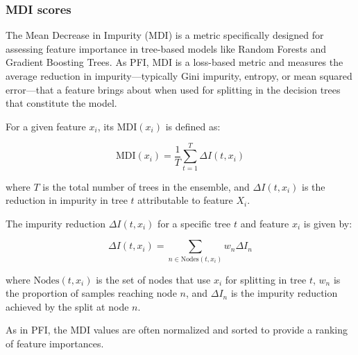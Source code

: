 \subsubsection{MDI scores}

The Mean Decrease in Impurity (\gls{MDI}) is a metric specifically designed for assessing feature importance in tree-based models like Random Forests and Gradient Boosting Trees. As \gls{PFI}, \gls{MDI} is a loss-based metric and measures the average reduction in impurity—typically Gini impurity, entropy, or mean squared error—that a feature brings about when used for splitting in the decision trees that constitute the model.

For a given feature \( x_i \), its \( \text{MDI}(x_i) \) is defined as:

\begin{equation}
\text{MDI}(x_i) = \frac{1}{T} \sum_{t=1}^{T} \Delta I(t, x_i)
\end{equation}

where \( T \) is the total number of trees in the ensemble, and \( \Delta I(t, x_i) \) is the reduction in impurity in tree \( t \) attributable to feature \( X_i \).

The impurity reduction \( \Delta I(t, x_i) \) for a specific tree \( t \) and feature \( x_i \) is given by:

\begin{equation}
\Delta I(t, x_i) = \sum_{n \in \text{Nodes}(t, x_i)} w_n \Delta I_n
\end{equation}

where \( \text{Nodes}(t, x_i) \) is the set of nodes that use \( x_i \) for splitting in tree \(t\), \( w_n \) is the proportion of samples reaching node \(n\), and \( \Delta I_n \) is the impurity reduction achieved by the split at node \( n \).

As in \gls{PFI}, the \gls{MDI} values are often normalized and sorted to provide a ranking of feature importances.

